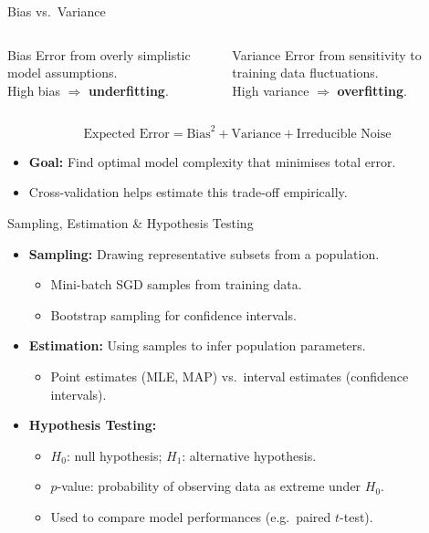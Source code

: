 \begin{frame}{Bias vs.\ Variance}
\begin{columns}[T]
\begin{block}{Bias}
Error from overly simplistic model assumptions.\\
High bias $\Rightarrow$ \textbf{underfitting}.
\end{block}
\begin{block}{Variance}
Error from sensitivity to training data fluctuations.\\
High variance $\Rightarrow$ \textbf{overfitting}.
\end{block}
\end{columns}
\vspace{6pt}
\[
\text{Expected Error} = \text{Bias}^2 + \text{Variance} + \text{Irreducible Noise}
\]
\begin{itemize}
    \item \textbf{Goal:} Find optimal model complexity that minimises total error.
    \item Cross-validation helps estimate this trade-off empirically.
\end{itemize}
\end{frame}

\begin{frame}{Sampling, Estimation \& Hypothesis Testing}
\begin{itemize}
    \item \textbf{Sampling:} Drawing representative subsets from a population.
    \begin{itemize}
        \item Mini-batch SGD samples from training data.
        \item Bootstrap sampling for confidence intervals.
    \end{itemize}
    \item \textbf{Estimation:} Using samples to infer population parameters.
    \begin{itemize}
        \item Point estimates (MLE, MAP) vs.\ interval estimates (confidence intervals).
    \end{itemize}
    \item \textbf{Hypothesis Testing:}
    \begin{itemize}
        \item $H_0$: null hypothesis; $H_1$: alternative hypothesis.
        \item $p$-value: probability of observing data as extreme under $H_0$.
        \item Used to compare model performances (e.g.\ paired $t$-test).
    \end{itemize}
\end{itemize}
\end{frame}

